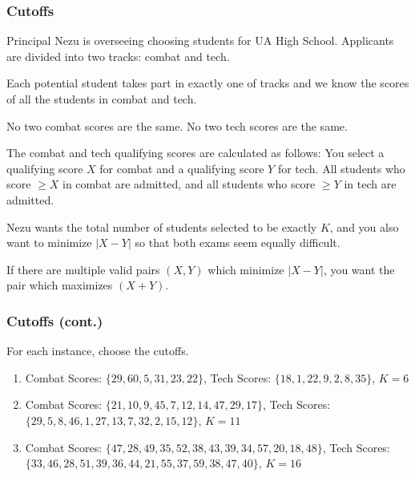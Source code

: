 \documentclass{beamer}
\begin{document}
\begin{frame}
\end{frame}

\begin{frame}[fragile]
\frametitle{Cutoffs}

Principal Nezu is overseeing choosing students for UA High School. Applicants are divided into two tracks: combat and tech.

Each potential student takes part in exactly one of tracks and we know the scores of all the students in combat and tech.

No two combat scores are the same. No two tech scores are the same.

The combat and tech qualifying scores are calculated as follows: You select a qualifying score $X$ for combat and a qualifying score $Y$ for tech. All students who score $\geq X$ in combat are admitted, and all students who score $\geq Y$ in tech are admitted.

Nezu wants the total number of students selected to be exactly $K$, and you also want to minimize $|X - Y|$ so that both exams seem equally difficult.

If there are multiple valid pairs $(X, Y)$ which minimize $|X - Y|$, you want the pair which maximizes $(X + Y)$.
\end{frame}

\begin{frame}
\frametitle{Cutoffs (cont.)}
For each instance, choose the cutoffs.

\begin{enumerate}
\item[(a)] Combat Scores: $\{29, 60, 5, 31, 23, 22\}$, Tech Scores: $\{18, 1, 22, 9, 2, 8, 35\}$, $K = 6$

\item[(b)] Combat Scores: $\{21, 10, 9, 45, 7, 12, 14, 47, 29, 17\}$, Tech Scores: $\{29, 5, 8, 46, 1, 27, 13, 7, 32, 2, 15, 12\}$, $K = 11$

\item[(c)] Combat Scores: $\{47, 28, 49, 35, 52, 38, 43, 39, 34, 57, 20, 18, 48\}$, Tech Scores: $\{33, 46, 28, 51, 39, 36, 44, 21, 55, 37, 59, 38, 47, 40\}$, $K = 16$
\end{enumerate}
\end{frame}

\begin{frame}
\end{frame}
\end{document}
